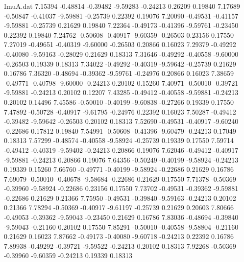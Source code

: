 \begin{filecontents}{ImuA.dat}
   7.15394   -0.48814   -0.39482   -9.59283   -0.24213    0.26209    0.19840
   7.17689   -0.50847   -0.41037   -9.59881   -0.25739    0.22392    0.19076
   7.20090   -0.49531   -0.41157   -9.59881   -0.25739    0.21629    0.19840
   7.22364   -0.49173   -0.41396   -9.59761   -0.23450    0.22392    0.19840
   7.24762   -0.50608   -0.40917   -9.60359   -0.26503    0.23156    0.17550
   7.27019   -0.49651   -0.40319   -9.60000   -0.26503    0.20866    0.16023
   7.29379   -0.49292   -0.40080   -9.59163   -0.28029    0.21629    0.18313
   7.31646   -0.49292   -0.40558   -9.60000   -0.26503    0.19339    0.18313
   7.34022   -0.49292   -0.40319   -9.59642   -0.25739    0.21629    0.16786
   7.36320   -0.48694   -0.39362   -9.59761   -0.24976    0.20866    0.16023
   7.38659   -0.49771   -0.40798   -9.60000   -0.24213    0.20102    0.15260
   7.40971   -0.50010   -0.39721   -9.59881   -0.24213    0.20102    0.12207
   7.43285   -0.49412   -0.40558   -9.59881   -0.24213    0.20102    0.14496
   7.45586   -0.50010   -0.40199   -9.60838   -0.27266    0.19339    0.17550
   7.47892   -0.50728   -0.40917   -9.61795   -0.24976    0.22392    0.16023
   7.50287   -0.49412   -0.39482   -9.59642   -0.26503    0.20102    0.18313
   7.52690   -0.49531   -0.40917   -9.60240   -0.22686    0.17812    0.19840
   7.54991   -0.50608   -0.41396   -9.60479   -0.24213    0.17049    0.18313
   7.57299   -0.48574   -0.40558   -9.58924   -0.25739    0.19339    0.17550
   7.59714   -0.49412   -0.40319   -9.59402   -0.24213    0.20866    0.19076
   7.62046   -0.49412   -0.40917   -9.59881   -0.24213    0.20866    0.19076
   7.64356   -0.50249   -0.40199   -9.58924   -0.24213    0.19339    0.15260
   7.66760   -0.49771   -0.40199   -9.58924   -0.22686    0.21629    0.16786
   7.69079   -0.50010   -0.40678   -9.58684   -0.22686    0.21629    0.17550
   7.71378   -0.50369   -0.39960   -9.58924   -0.22686    0.23156    0.17550
   7.73702   -0.49531   -0.39362   -9.59881   -0.22686    0.21629    0.21366
   7.75950   -0.49531   -0.39840   -9.59163   -0.24213    0.20102    0.21366
   7.78294   -0.50369   -0.40917   -9.61197   -0.25739    0.21629    0.20603
   7.80666   -0.49053   -0.39362   -9.59043   -0.23450    0.21629    0.16786
   7.83036   -0.48694   -0.39840   -9.59043   -0.21160    0.20102    0.17550
   7.85291   -0.50010   -0.40558   -9.58804   -0.21160    0.21629    0.16023
   7.87662   -0.49173   -0.40080   -9.60718   -0.24213    0.22392    0.16786
   7.89938   -0.49292   -0.39721   -9.59522   -0.24213    0.20102    0.18313
   7.92268   -0.50369   -0.39960   -9.60359   -0.24213    0.19339    0.18313

\end{filecontents}

